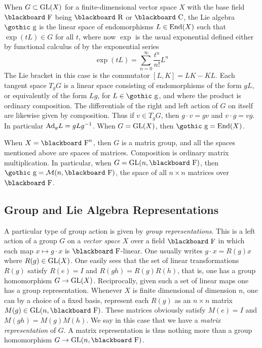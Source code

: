 \documentclass[12pt,titlepage]{article}
\def\bbf#1{\hbox{\blackboard #1}}
\def\goth#1{\hbox{\gothic #1}}
\def\lC{\bbf C}
\def\lF{\bbf F}
\def\lR{\bbf R}
\def\cM{{\cal M}}
\def\gg{{\goth g}}
\def\Ad{\hbox{Ad}}
\def\End{\hbox{End}}
\def\GL{\hbox{GL}}
\begin{document}
When \(G\subset \GL(X)\) for a finite-dimensional vector 
space \(X\) with the base field \(\lF\) being
 \(\lR\) or \(\lC\), the Lie algebra \(\gg\)
is the 
linear space of endomorphisms \(L\in\End(X)\) such that  
\(\exp (tL)\in G\) for all \(t\), where now 
\(\exp\) is the usual exponential  defined either by functional
calculus of by the exponential series
\[
\exp(tL) = \sum_{n=0}^\infty \frac{t^n}{n!}L^n
\]
The Lie bracket in this case is the commutator \([L,K] = LK-KL\). 
Each tangent space \(T_gG\) is a linear space 
consisting of endomorphisms of the form \(gL\), or equivalently of the form
\(Lg\), for \(L\in \gg\), and where the product is ordinary composition.
The differentials of the right and left action of \(G\) on itself are
likewise given by composition. Thus if \(v\in T_gG\),
then
\(g\cdot v = gv\) and \(v\cdot g= vg\). In particular \(\Ad_gL =
gLg^{-1}\). When \(G=\GL(X)\), then \(\gg = \End(X)\).

When \(X=\lF^n\),  then \(G\) is a matrix group, and all the spaces
mentioned above are spaces of matrices. Composition is ordinary matrix
multiplication. In particular, 
when \(G=\GL(n,\lF)\), then \(\gg = \cM(n,\lF)\), 
\index{\(M(n,\lF)\)@\(\cM(n,\lF)\)}%
the space of all \(n
\times n\) matrices over \(\lF\). 

\subsection{Group and Lie Algebra Representations}\label{sec:reps}


A particular type of group action is given by {\em group
representations\/}.
%
This is a left action of a group \(G\) on a {\em
vector space\/} \(X\) over a field \(\lF\) in which each map
\(x\mapsto g\cdot x\) is \(\lF\)-linear. One usually writes \(g\cdot
x =
R(g)x\) where \(R(g) \in \GL(X)\). 
One easily sees that the set of linear transformations
\(R(g)\)
% 
satisfy \(R(e) =I\) and \( R(gh) = R(g)R(h)\), that is, one has a 
group homomorphism \(G\to\GL(X)\). Reciprocally,
given such a set of linear maps one has a group representation.
Whenever \(X\) is finite dimensional of dimension \(n\),  one can by a
choice of a fixed basis, represent each \(R(g)\) as an \(n\times n\)
matrix \(M(g) \in \GL(n,\lF)\). These matrices obviously satisfy \(M(e) =
I\)
and \(M(gh)=M(g)M(h) \). We say in this case that we have a {\em matrix
representation\/}
%
 of \(G\). A matrix representation is thus nothing more
than a group homomorphism \(G \to \GL(n,\lF)\).
\end{document}
